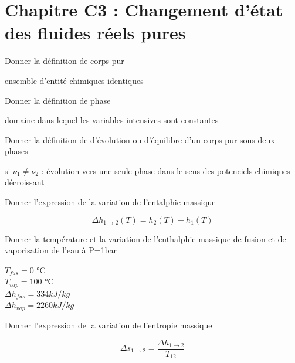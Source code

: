 \section*{\centering Chapitre C3 : Changement d'état des fluides réels pures} 
\begin{enumerate}[label=\arabic{enumi} - , left=0pt, itemsep=1em] %
   
    \item Donner la définition de corps pur \par
    \begin{solution}
        ensemble d'entité chimiques identiques
    \end{solution}

    \item Donner la définition de phase \par
    \begin{solution}
        domaine dans lequel les variables intensives sont constantes
    \end{solution}

    \item Donner la définition de d'évolution ou d'équilibre d'un corps pur sous deux phases\par
    \begin{solution}
        si $\nu_1 \neq \nu_2$ : évolution vers une seule phase dans le sens des potenciels chimiques décroissant 
    \end{solution}

    \item Donner l'expression de la variation de l'entalphie massique\par
    \begin{solution}
        \[ \Delta h_{1 \rightarrow 2}(T) = h_2(T) - h_1(T)\]
    \end{solution}


    \item Donner la température et la variation de l'enthalphie massique de fusion et de vaporisation de l'eau à P=1bar\par
    \begin{solution}
        $T_{fus} = 0$ °C \\
        $T_{vap} = 100$ °C \\
        $\Delta h_{fus} = 334 kJ/kg$\\
        $\Delta h_{vap} = 2260 kJ/kg$\\

    \item Donner l'expression de la variation de l'entropie massique\par
    \begin{solution}
        \[ \Delta s_{1 \rightarrow 2} = \frac{\Delta h_{1 \rightarrow 2}}{T_{12}}\]
    \end{solution}
    \end{solution}



\end{enumerate}
